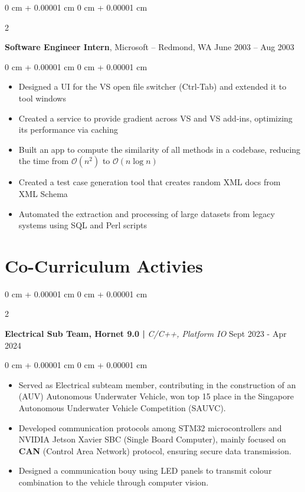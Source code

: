 \documentclass[10pt, letterpaper]{article}
\newenvironment{highlights}{
    \begin{itemize}[
        topsep=0.10 cm,
        parsep=0.10 cm,
        partopsep=0pt,
        itemsep=0pt,
        leftmargin=0 cm + 10pt
    ]
}{
    \end{itemize}
} %
\newenvironment{onecolentry}{
    \begin{adjustwidth}{
        0 cm + 0.00001 cm
    }{
        0 cm + 0.00001 cm
    }
}{
    \end{adjustwidth}
} %
\newenvironment{twocolentry}[2][]{
    \onecolentry
    \def\secondColumn{#2}
    \setcolumnwidth{\fill, 4.5 cm}
    \begin{paracol}{2}
}{
    \switchcolumn \raggedleft \secondColumn
    \end{paracol}
    \endonecolentry
} %
\begin{document}
        \vspace{0.2 cm}

        \begin{twocolentry}{
            June 2003 – Aug 2003
        }
            \textbf{Software Engineer Intern}, Microsoft -- Redmond, WA\end{twocolentry}

        \vspace{0.10 cm}
        \begin{onecolentry}
            \begin{highlights}
                \item Designed a UI for the VS open file switcher (Ctrl-Tab) and extended it to tool windows
                \item Created a service to provide gradient across VS and VS add-ins, optimizing its performance via caching
                \item Built an app to compute the similarity of all methods in a codebase, reducing the time from $\mathcal{O}(n^2)$ to $\mathcal{O}(n \log n)$
                \item Created a test case generation tool that creates random XML docs from XML Schema
                \item Automated the extraction and processing of large datasets from legacy systems using SQL and Perl scripts
            \end{highlights}
        \end{onecolentry}
    
    \section{Co-Curriculum Activies}

        \begin{twocolentry}{
            Sept 2023 - Apr 2024
        }
            \textbf{Electrical Sub Team, Hornet 9.0 | }\textit{C/C++, Platform IO}\end{twocolentry}

        \vspace{0.15 cm}
        \begin{onecolentry}
            \begin{highlights}
                \item Served as Electrical subteam member, contributing in the construction of an (AUV) Autonomous Underwater Vehicle, won top 15 place in the Singapore Autonomous Underwater Vehicle Competition (SAUVC).
                \item Developed communication protocols among STM32 microcontrollers and NVIDIA Jetson Xavier SBC (Single Board Computer), mainly focused on \textbf{CAN} (Control Area Network) protocol, ensuring secure data transmission.  
                \item Designed a communication bouy using LED panels to transmit colour combination to the vehicle through computer vision.
            \end{highlights}
        \end{onecolentry}
\end{document}

